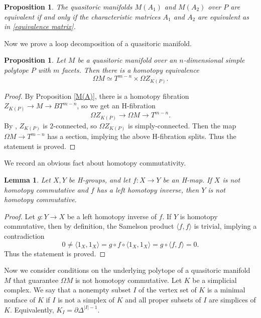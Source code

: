 \documentclass[a4paper]{amsart}
\numberwithin{equation}{section}
\newtheorem{proposition}[theorem]{Proposition}
\newtheorem{lemma}[theorem]{Lemma}
\theoremstyle{definition}
\theoremstyle{remark}
\numberwithin{equation}{section}
\begin{document}
\begin{proposition}
  \label{equivalence}
  The quasitoric manifolds $M(A_1)$ and $M(A_2)$ over $P$ are equivalent if and only if the characteristic matrices $A_1$ and $A_2$ are equivalent as in \eqref{equivalence matrix}.
\end{proposition}



Now we prove a loop decomposition of a quasitoric manifold.



\begin{proposition}
  \label{decomposition}
  Let $M$ be a quasitoric manifold over an $n$-dimensional simple polytope $P$ with $m$ facets. Then there is a homotopy equivalence
  \[
    \Omega M\simeq T^{m-n}\times\Omega Z_{K(P)}.
  \]
\end{proposition}

\begin{proof}
  By Proposition \ref{M(A)}, there is a homotopy fibration $Z_{K(P)}\to M\to BT^{m-n}$, so we get an H-fibration
  \[
    \Omega Z_{K(P)}\to\Omega M\to T^{m-n}.
  \]
  By \cite[Theorem 3.4.7]{BP}, $Z_{K(P)}$ is $2$-connected, so $\Omega Z_{K(P)}$ is simply-connected. Then the map $\Omega M\to T^{m-n}$ has a section, implying the above H-fibration splits. Thus the statement is proved.
\end{proof}



We record an obvious fact about homotopy commutativity.



\begin{lemma}
  \label{retract commutative}
  Let $X,Y$ be H-groups, and let $f\colon X\to Y$ be an H-map. If $X$ is not homotopy commutative and $f$ has a left homotopy inverse, then $Y$ is not homotopy commutative.
\end{lemma}

\begin{proof}
  Let $g\colon Y\to X$ be a left homotopy inverse of $f$. If $Y$ is homotopy commutative, then by definition, the Samelson product $\langle f,f\rangle$ is trivial, implying a contradiction
  \[
    0\ne\langle 1_X,1_X\rangle=g\circ f\circ\langle 1_X,1_X\rangle=g\circ\langle f,f\rangle=0.
  \]
  Thus the statement is proved.
\end{proof}



Now we consider conditions on the underlying polytope of a quasitoric manifold $M$ that guarantee $\Omega M$ is not homotopy commutative. Let $K$ be a simplicial complex. We say that a nonempty subset $I$ of the vertex set of $K$ is a minimal nonface of $K$ if $I$ is not a simplex of $K$ and all proper subsets of $I$ are simplices of $K$. Equivalently, $K_I=\partial\Delta^{|I|-1}$.
\end{document}
